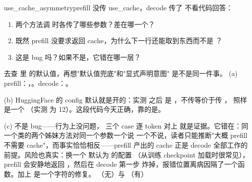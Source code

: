 \begin{checkpoint}{use_cache_asymmetry}{prefill 没传 use\_cache，decode 传了}
不看代码回答：
\begin{enumerate}[label=(\alph*)]
  \item 两个方法调  时各传了哪些参数？差在哪一个？
  \item 既然 prefill 没要求返回 cache，为什么下一行还能取到东西而不是 ？
  \item 这是 bug 吗？如果不是，它错在哪一层？
\end{enumerate}
\hint 去查  里  的默认值，再想"默认值兜底"和"显式声明意图"
是不是同一件事。
\ifshowanswers
\tcblower
\answer (a) prefill：，。decode：。

(b) HuggingFace 的 config 默认就是开的：实测
 之后  是
，不传等价于传 ， 照样是一个
（实测  为 12）。这段代码今天正确，靠的是。

(c) 不是 bug——行为上没问题， 三个 case 逐 token 对上
 就是证据。它错在：同一个类的两个姊妹方法对同一个参数一个说
一个不说，读者只能推断"大概 prefill 不需要 cache"，而事实恰恰相反——prefill 产出的 cache 正是
decode 全部工作的前提。风险也真实：换一个  默认为  的配置
（从训练 checkpoint 加载时很常见），prefill 会安静地返回 ，然后在 decode 第一步
炸掉，报错位置离病因隔了一个函数。加上  是一个字符的修复。
\whereincode {}（无）与
（有）
\fi
\end{checkpoint}

